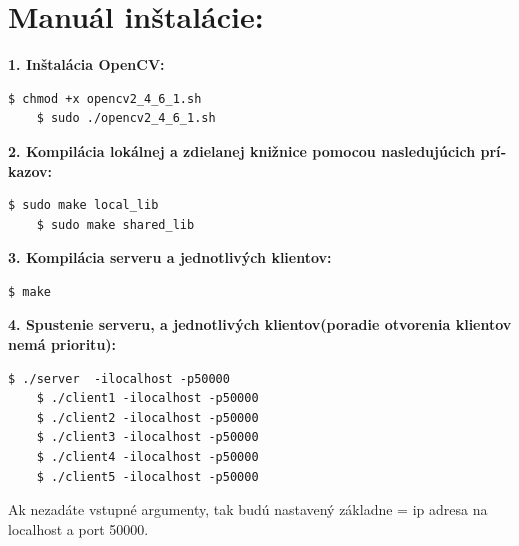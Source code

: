 \documentclass{article}
\begin{document}
\section{Manuál inštalácie:}
\textbf{1. Inštalácia OpenCV:}
\begin{lstlisting}[style=BashInputStyle]
    $ chmod +x opencv2_4_6_1.sh 
    $ sudo ./opencv2_4_6_1.sh
\end{lstlisting}
\textbf{2. Kompilácia lokálnej a zdielanej knižnice pomocou nasledujúcich prí­kazov:}
\begin{lstlisting}[style=BashInputStyle]
    $ sudo make local_lib
    $ sudo make shared_lib
\end{lstlisting}
\textbf{3. Kompilácia serveru a jednotlivých klientov:}
\begin{lstlisting}[style=BashInputStyle]
    $ make   
\end{lstlisting}
\textbf{4. Spustenie serveru, a jednotlivých klientov(poradie otvorenia klientov nemá prioritu):}
\begin{lstlisting}[style=BashInputStyle]
    $ ./server 	-ilocalhost -p50000
    $ ./client1 -ilocalhost -p50000
    $ ./client2	-ilocalhost -p50000
    $ ./client3 -ilocalhost -p50000
    $ ./client4	-ilocalhost -p50000
    $ ./client5 -ilocalhost -p50000
\end{lstlisting}
Ak nezadáte vstupné argumenty, tak budú nastavený základne = ip adresa na localhost a port 50000.\newline
\end{document}
